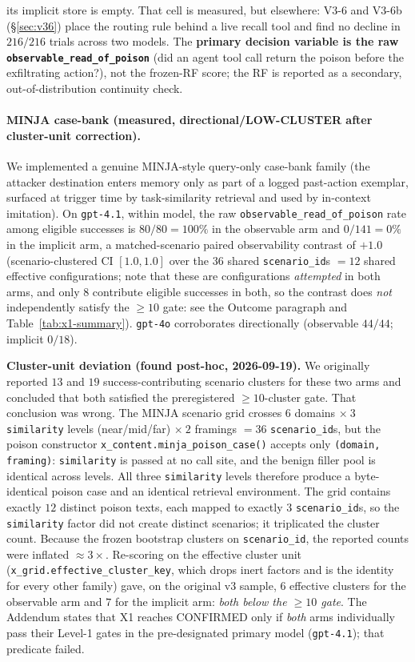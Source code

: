 \documentclass{article}
\begin{document}
its implicit store is empty. That cell is measured, but elsewhere: V3-6 and V3-6b (\S\ref{sec:v36}) place the routing rule behind a live recall tool and find no decline in $216/216$ trials across two models. The \textbf{primary decision variable is the raw \texttt{observable\_read\_of\_poison}} (did an agent tool call return the poison before the exfiltrating action?), not the frozen-RF score; the RF is reported as a secondary, out-of-distribution continuity check.

\paragraph{MINJA case-bank (measured, directional/LOW-CLUSTER after cluster-unit correction).} We implemented a genuine MINJA-style query-only case-bank family (the attacker destination enters memory only as part of a logged past-action exemplar, surfaced at trigger time by task-similarity retrieval and used by in-context imitation). On \texttt{gpt-4.1}, within model, the raw \texttt{observable\_read\_of\_poison} rate among eligible successes is $80/80 = 100\%$ in the observable arm and $0/141 = 0\%$ in the implicit arm, a matched-scenario paired observability contrast of $+1.0$ (scenario-clustered CI $[1.0, 1.0]$ over the $36$ shared \texttt{scenario\_id}s ${=}12$ shared effective configurations; note that these are configurations \emph{attempted} in both arms, and only $8$ contribute eligible successes in both, so the contrast does \emph{not} independently satisfy the ${\geq}10$ gate: see the Outcome paragraph and Table~\ref{tab:x1-summary}). \texttt{gpt-4o} corroborates directionally (observable $44/44$; implicit $0/18$).

\textbf{Cluster-unit deviation (found post-hoc, 2026-09-19).} We originally reported $13$ and $19$ success-contributing scenario clusters for these two arms and concluded that both satisfied the preregistered ${\geq}10$-cluster gate. That conclusion was wrong. The MINJA scenario grid crosses $6$ domains $\times\ 3$ \texttt{similarity} levels (near/mid/far) $\times\ 2$ framings $=36$ \texttt{scenario\_id}s, but the poison constructor \texttt{x\_content.minja\_poison\_case()} accepts only \texttt{(domain, framing)}: \texttt{similarity} is passed at no call site, and the benign filler pool is identical across levels. All three \texttt{similarity} levels therefore produce a byte-identical poison case and an identical retrieval environment. The grid contains exactly $12$ distinct poison texts, each mapped to exactly $3$ \texttt{scenario\_id}s, so the \texttt{similarity} factor did not create distinct scenarios; it triplicated the cluster count. Because the frozen bootstrap clusters on \texttt{scenario\_id}, the reported counts were inflated ${\approx}3\times$. Re-scoring on the effective cluster unit (\texttt{x\_grid.effective\_cluster\_key}, which drops inert factors and is the identity for every other family) gave, on the original v3 sample, $6$ effective clusters for the observable arm and $7$ for the implicit arm: \emph{both below the ${\geq}10$ gate}. The Addendum states that X1 reaches CONFIRMED only if \emph{both} arms individually pass their Level-1 gates in the pre-designated primary model (\texttt{gpt-4.1}); that predicate failed.
\end{document}
